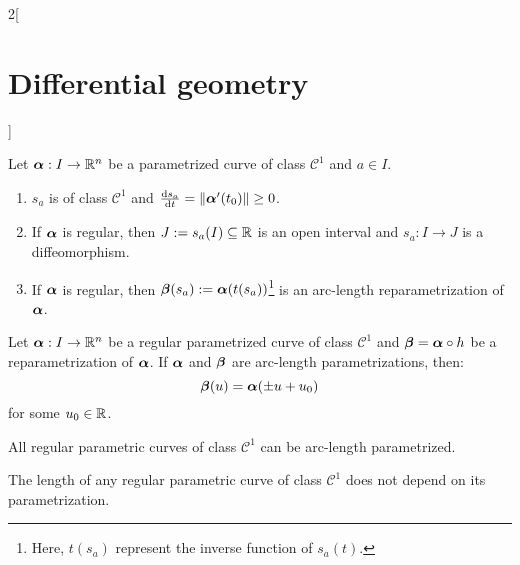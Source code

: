 \documentclass[../../../main.tex]{subfiles}
\begin{document}
\begin{multicols}{2}[\section{Differential geometry}]
  \begin{proposition}
    Let $\boldsymbol{\mathrm{\alpha}}:I\rightarrow\mathbb{R}^n$ be a parametrized curve of class $\mathcal{C}^1$ and $a\in I$.
    \begin{enumerate}
      \item $s_a$ is of class $\mathcal{C}^1$ and $\dv{s_a}{t}(t_0)=\|\boldsymbol{\mathrm{\alpha}}'(t_0)\|\geq 0$.
      \item If $\boldsymbol{\mathrm{\alpha}}$ is regular, then $J:=s_a(I)\subseteq\mathbb{R}$ is an open interval and $s_a:I\rightarrow J$ is a diffeomorphism.
      \item If $\boldsymbol{\mathrm{\alpha}}$ is regular, then $\boldsymbol{\mathrm{\beta}}(s_a):=\boldsymbol{\mathrm{\alpha}}(t(s_a))$\footnote{Here, $t(s_a)$ represent the inverse function of $s_a(t)$.} is an arc-length reparametrization of $\boldsymbol{\mathrm{\alpha}}$.
    \end{enumerate}
  \end{proposition}
  \begin{proposition}
    Let $\boldsymbol{\mathrm{\alpha}}:I\rightarrow\mathbb{R}^n$ be a regular parametrized curve of class $\mathcal{C}^1$ and $\boldsymbol{\mathrm{\beta}}=\boldsymbol{\mathrm{\alpha}}\circ h$ be a reparametrization of $\boldsymbol{\mathrm{\alpha}}$. If $\boldsymbol{\mathrm{\alpha}}$ and $\boldsymbol{\mathrm{\beta}}$ are arc-length parametrizations, then: $$\boldsymbol{\mathrm{\beta}}(u)=\boldsymbol{\mathrm{\alpha}}(\pm u+u_0)$$ for some $u_0\in\mathbb{R}$.
  \end{proposition}
  \begin{proposition}
    All regular parametric curves of class $\mathcal{C}^1$ can be arc-length parametrized.
  \end{proposition}
  \begin{proposition}
    The length of any regular parametric curve of class $\mathcal{C}^1$ does not depend on its parametrization.
  \end{proposition}

\end{multicols}
\end{document}
